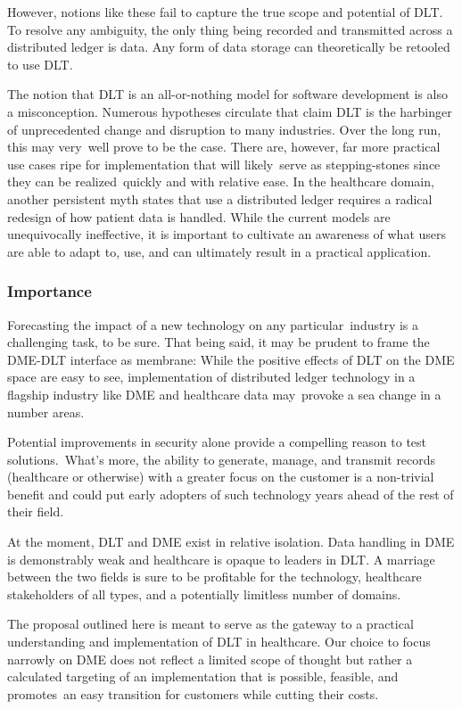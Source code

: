 \documentclass[letterpaper]{article}
\begin{document}
  However, notions like these fail to capture the true scope and potential of DLT. To resolve any ambiguity, the only thing being recorded and transmitted across a distributed ledger is data. Any form of data storage can theoretically be retooled to use DLT.%

  The notion that DLT is an all-or-nothing model for software development is also a misconception. Numerous hypotheses circulate that claim DLT is the harbinger of unprecedented change and disruption to many industries. Over the long run, this may very well prove to be the case. There are, however, far more practical use cases ripe for implementation that will likely serve as stepping-stones since they can be realized quickly and with relative ease.%
%
  In the healthcare domain, another persistent myth states that use a distributed ledger requires a radical redesign of how patient data is handled. While the current models are unequivocally ineffective, it is important to cultivate an awareness of what users are able to adapt to, use, and can ultimately result in a practical application.%

  \subsubsection{Importance}
  Forecasting the impact of a new technology on any particular industry is a challenging task, to be sure. That being said, it may be prudent to frame the DME-DLT interface as membrane: While the positive effects of DLT on the DME space are easy to see, implementation of distributed ledger technology in a flagship industry like DME and healthcare data may provoke a sea change in a number areas.%

  Potential improvements in security alone provide a compelling reason to test solutions. What's more, the ability to generate, manage, and transmit records (healthcare or otherwise) with a greater focus on the customer is a non-trivial benefit and could put early adopters of such technology years ahead of the rest of their field.%

  At the moment, DLT and DME exist in relative isolation. Data handling in DME is demonstrably weak and healthcare is opaque to leaders in DLT. A marriage between the two fields is sure to be profitable for the technology, healthcare stakeholders of all types, and a potentially limitless number of domains.%

  The proposal outlined here is meant to serve as the gateway to a practical understanding and implementation of DLT in healthcare. Our choice to focus narrowly on DME does not reflect a limited scope of thought but rather a calculated targeting of an implementation that is possible, feasible, and promotes an easy transition for customers while cutting their costs.%
\end{document}

